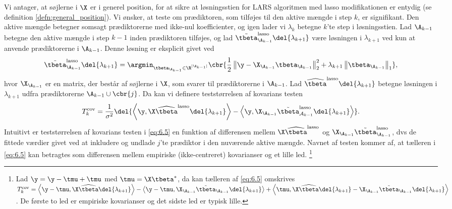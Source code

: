 Vi antager, at søjlerne i \(\X\) er i generel position, for at sikre at løsningsstien for LARS algoritmen med lasso modifikationen er entydig (se definition \ref{defn:general_position}).
Vi ønsker, at teste om prædiktoren, som tilføjes til den aktive mængde i step \(k\), er signifikant.
Den aktive mængde betegner somsagt prædiktorerne med ikke-nul koefficienter, og igen lader vi \(\lambda_k\) betegne \(k\)'te step i løsningsstien.
Lad \(\A_{k-1}\) betegne den aktive mængde i step \(k-1\) inden prædiktoren tilføjes, og lad \(\tilde{\tbeta}^\text{lasso}_{\A_{k-1}} \del{\lambda_{k+1}}\) være løsningen i \(\lambda_{k+1}\) ved kun at anvende prædiktorerne i \(\A_{k-1}\).
Denne løsning er eksplicit givet ved 
\begin{align*}
\tilde{\tbeta}^\text{lasso}_{\A_{k-1}} \del{\lambda_{k+1}} = \argmin_{\tbeta_{\A_{k-1}} \in \R^{\vert \A_{k-1} \vert}} \cbr{\frac{1}{2} \left\Vert \y - \X_{\A_{k-1}} \tbeta_{\A_{k-1}} \right\Vert_2^2 + \lambda_{k+1} \left\Vert \tbeta_{\A_{k-1}} \right\Vert_1},
\end{align*}
hvor \(\X_{\A_{k-1}}\) er en matrix, der består af søjlerne i \(\X\), som svarer til prædiktorerne i \(\A_{k-1}\).
Lad \(\widehat{\tbeta}^\text{lasso} \del{\lambda_{k+1}}\) betegne løsningen i \(\lambda_{k+1}\) udfra prædiktorerne \(\A_{k-1} \cup \cbr{j}\).
Da kan vi definere teststørrelsen af kovarians testen
\begin{align}
T_k^\text{cov} = \frac{1}{\sigma^2} \del{ \left\langle \y, \X \widehat{\tbeta}^\text{lasso} \del{\lambda_{k+1}} \right\rangle - \left\langle  \y, \X_{\A_{k-1}} \tilde{\tbeta}^\text{lasso}_{\mathcal{A}_{k-1}} \del{\lambda_{k+1}} \right\rangle}. \label{eq:6.5}
\end{align}
Intuitivt er teststørrelsen af kovarians testen i \eqref{eq:6.5} en funktion af differensen mellem \(\X \widehat{\tbeta}^\text{lasso}\) og \(\X_{\A_{k-1}} \tilde{\tbeta}^\text{lasso}_{\A_{k-1}}\), dvs de fittede værdier givet ved at inkludere og undlade \(j\)'te prædiktor i den nuværende aktive mængde.
Navnet af testen kommer af, at tælleren i \eqref{eq:6.5} kan betragtes som differensen mellem empiriske (ikke-centreret) kovarianser og et lille led. 
\footnote{Lad \(\y = \y - \tmu + \tmu\) med \(\tmu = \X \tbeta^*\), da kan tælleren af \eqref{eq:6.5} omskrives \(T_k^\text{cov} = \left\langle \y - \tmu, \X \widehat{\tbeta} \del{\lambda_{k+1}} \right\rangle - \left\langle \y - \tmu, \X_{\A_{k-1}} \tilde{\tbeta}_{\A_{k-1}} \del{\lambda_{k+1}} \right\rangle + \left\langle \tmu, \X \widehat{\tbeta} \del{\lambda_{k+1}} - \X_{\A_{k-1}} \tilde{\tbeta}_{\A_{k-1}} \del{\lambda_{k+1}} \right\rangle\).
De første to led er empiriske kovarianser og det sidste led er typisk lille.}
